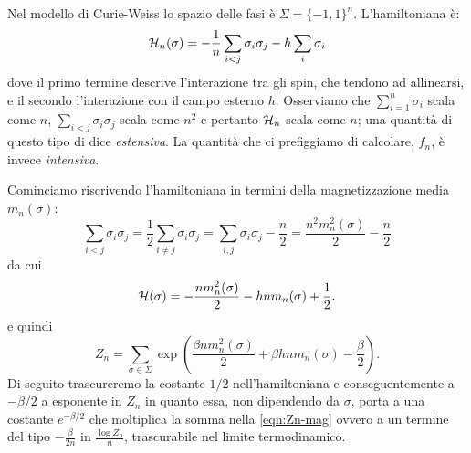 Nel modello di Curie-Weiss lo spazio delle fasi è $ \Sigma = \{-1,1\}^n $. L'hamiltoniana è:
\begin{equation}
    \mathcal{H}_n(\sigma) = -\frac{1}{n} \sum_{i<j} \sigma_i \sigma_j - h \sum_i \sigma_i
\end{equation}
dove il primo termine descrive l'interazione tra gli spin, che tendono ad allinearsi, e il secondo l'interazione con il campo esterno $ h $. Osserviamo che $ \sum_{i=1}^{n} \sigma_i $ scala come $ n $, $ \sum_{i<j} \sigma_i \sigma_j $ scala come $ n^2 $  e pertanto $ \mathcal{H}_n $ scala come $ n $; una quantità di questo tipo di dice \emph{estensiva}. La quantità che ci prefiggiamo di calcolare, $ f_n $, è invece \emph{intensiva}.

Cominciamo riscrivendo l'hamiltoniana in termini della magnetizzazione media $ m_n(\sigma) $:
\[ \sum_{i<j} \sigma_i \sigma_j = \frac{1}{2} \sum_{i \neq j} \sigma_i \sigma_j = \sum_{i,j} \sigma_i \sigma_j -\frac{n}{2} = \frac{n^2 m_n^2(\sigma)}{2} - \frac{n}{2} \]
da cui
\begin{equation}
    \mathcal{H}(\sigma) = -\frac{n m_n^2(\sigma)}{2} - hnm_n(\sigma) + \frac{1}{2}.
\end{equation}
e quindi
\begin{equation} \label{eqn:Zn-mag}
    Z_n = \sum_{\sigma \in \Sigma} \exp\left( \frac{\beta n m_n^2(\sigma)}{2} + \beta h n m_n(\sigma) - \frac{\beta}{2}\right).
\end{equation}
Di seguito trascureremo la costante $ 1/2 $ nell'hamiltoniana e conseguentemente a $ -\beta/2 $ a esponente in $ Z_n $ in quanto essa, non dipendendo da $ \sigma $, porta a una costante $ e^{-\beta/2} $ che moltiplica la somma nella \eqref{eqn:Zn-mag} ovvero a un termine del tipo $ -\frac{\beta}{2n} $ in $ \frac{\log Z_n}{n} $, trascurabile nel limite termodinamico.

